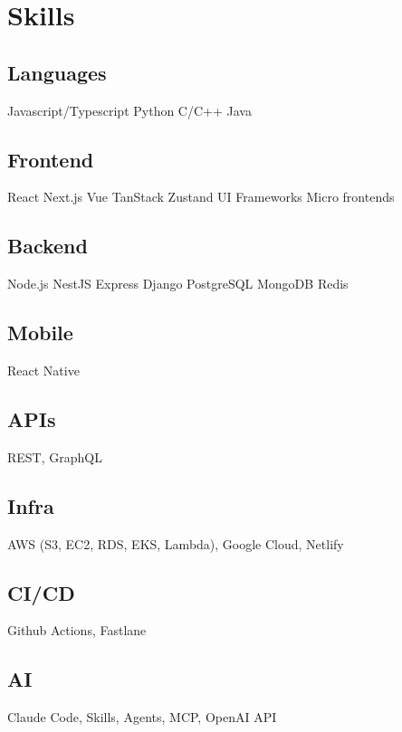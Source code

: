 \documentclass[]{plushcv}
\begin{document}
\begin{minipage}[t]{0.25\textwidth} 


\section{Skills}
\subsection{Languages}
\sectionsep
Javascript/Typescript \textbullet{} Python \textbullet{} C/C++ \textbullet{} Java
\sectionsep
\subsection{Frontend}
\sectionsep
React \textbullet{} Next.js \textbullet{} Vue \textbullet{} TanStack \textbullet{} Zustand \textbullet{} UI Frameworks \textbullet{} Micro frontends
\sectionsep
\subsection{Backend}
\sectionsep
Node.js \textbullet{} NestJS \textbullet{} Express \textbullet{} Django \textbullet{} PostgreSQL \textbullet{} MongoDB \textbullet{} Redis
\sectionsep
\subsection{Mobile}
\sectionsep
React Native
\sectionsep
\subsection{APIs}
\sectionsep
REST, GraphQL
\sectionsep
\subsection{Infra}
\sectionsep
AWS (S3, EC2, RDS, EKS, Lambda), Google Cloud, Netlify
\sectionsep
\subsection{CI/CD}
\sectionsep
Github Actions, Fastlane
\sectionsep
\subsection{AI}
\sectionsep
Claude Code, Skills, Agents, MCP, OpenAI API


\end{minipage}
\end{document}
